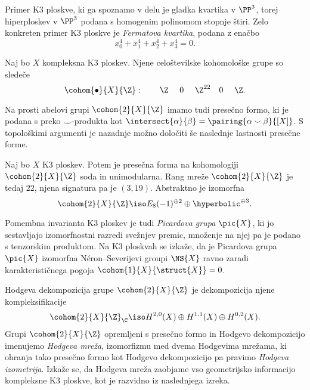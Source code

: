Primer K3 ploskve, ki ga spoznamo v delu je gladka kvartika v $\PP^3$, torej hiperploskev v $\PP^3$ podana s homogenim polinomom stopnje štiri. Zelo konkreten primer K3 ploskve je \emph{Fermatova kvartika}, podana z enačbo
\[
    x_0^4 + x_1^4 + x_2^4 + x_3^4 = 0.
\]






\begin{trditev}
    Naj bo $X$ kompleksna K3 ploskev. Njene celoštevilske kohomološke grupe so sledeče
    \begin{equation}
        \cohom{\bullet}{X}{\Z}: \qquad \Z \ \quad 0\ \quad \Z^{22} \quad 0\ \quad \Z.
    \end{equation}
\end{trditev}

Na prosti abelovi grupi $\cohom{2}{X}{\Z}$ imamo tudi presečno formo, ki je podana s preko $\smallsmile$-produkta kot $\intersect{\alpha}{\beta} = \pairing{\alpha \smallsmile \beta}{[X]}$. S topološkimi argumenti je nazadnje možno določiti še naslednje lastnosti presečne forme.

\begin{trditev}
    Naj bo $X$ K3 ploskev. Potem je presečna forma na kohomologiji $\cohom{2}{X}{\Z}$ soda in unimodularna. Rang mreže $\cohom{2}{X}{\Z}$ je tedaj $22$, njena signatura pa je $(3,19)$. Abstraktno je izomorfna
    \begin{equation}
        \cohom{2}{X}{\Z} \iso E_8(-1)^{\oplus 2} \oplus \hyperbolic^{\oplus 3}.
    \end{equation}
\end{trditev}

Pomembna invarianta K3 ploskev je tudi \emph{Picardova grupa} $\pic{X}$, ki jo sestavljajo izomorfnostni razredi svežnjev premic, množenje na njej pa je podano s tenzorskim produktom. Na K3 ploskvah se izkaže, da je Picardova grupa $\pic{X}$ izomorfna Néron--Severijevi groupi $\NS{X}$ ravno zaradi karakterističnega pogoja $\cohom{1}{X}{\struct{X}} = 0$. 

Hodgeva dekompozicija grupe $\cohom{2}{X}{\Z}$ je dekompozicija njene kompleksifikacije
\[
    \cohom{2}{X}{\Z}_\C \iso H^{2,0}(X) \oplus H^{1,1}(X) \oplus H^{0,2}(X).
\]
Grupi $\cohom{2}{X}{\Z}$ opremljeni s presečno formo in Hodgevo dekompozicijo imenujemo \emph{Hodgeva mreža}, izomorfizmu med dvema Hodgevima mrežama, ki ohranja tako presečno formo kot Hodgevo dekompozicijo pa pravimo \emph{Hodgeva izometrija}. Izkaže se, da Hodgeva mreža zaobjame vso geometrijsko informacijo kompleksne K3 ploskve, kot je razvidno iz naslednjega izreka. 

